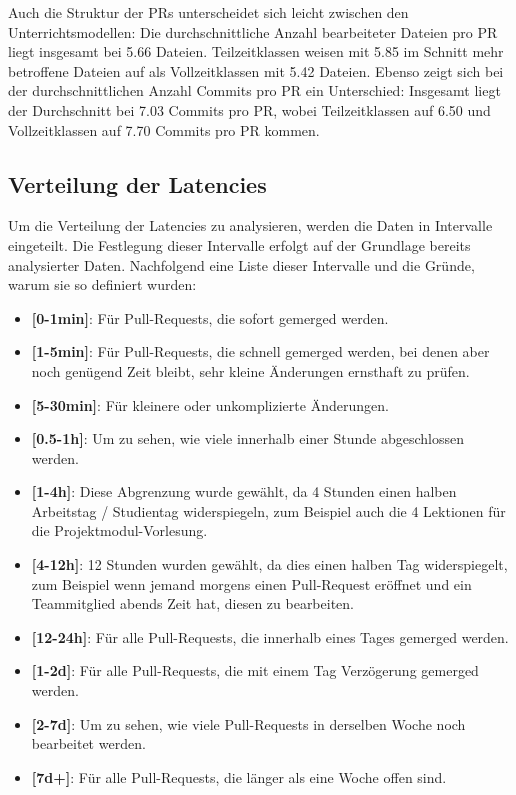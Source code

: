 Auch die Struktur der PRs unterscheidet sich leicht zwischen den Unterrichtsmodellen: Die durchschnittliche Anzahl bearbeiteter Dateien pro PR liegt insgesamt bei 5.66 Dateien. Teilzeitklassen weisen mit 5.85 im Schnitt mehr betroffene Dateien auf als Vollzeitklassen mit 5.42 Dateien. Ebenso zeigt sich bei der durchschnittlichen Anzahl Commits pro PR ein Unterschied: Insgesamt liegt der Durchschnitt bei 7.03 Commits pro PR, wobei Teilzeitklassen auf 6.50 und Vollzeitklassen auf 7.70 Commits pro PR kommen.

\subsection{Verteilung der Latencies}
Um die Verteilung der Latencies zu analysieren, werden die Daten in Intervalle eingeteilt. Die Festlegung dieser Intervalle erfolgt auf der Grundlage bereits analysierter Daten. Nachfolgend eine Liste dieser Intervalle und die Gründe, warum sie so definiert wurden: 

\begin{itemize}
    \item \textbf{[0-1min]}: Für Pull-Requests, die sofort gemerged werden.
    \item \textbf{[1-5min]}: Für Pull-Requests, die schnell gemerged werden, bei denen aber noch genügend Zeit bleibt, sehr kleine Änderungen ernsthaft zu prüfen.
    \item \textbf{[5-30min]}: Für kleinere oder unkomplizierte Änderungen.
    \item \textbf{[0.5-1h]}: Um zu sehen, wie viele innerhalb einer Stunde abgeschlossen werden.
    \item \textbf{[1-4h]}: Diese Abgrenzung wurde gewählt, da 4 Stunden einen halben Arbeitstag / Studientag widerspiegeln, zum Beispiel auch die 4 Lektionen für die Projektmodul-Vorlesung.
    \item \textbf{[4-12h]}: 12 Stunden wurden gewählt, da dies einen halben Tag widerspiegelt, zum Beispiel wenn jemand morgens einen Pull-Request eröffnet und ein Teammitglied abends Zeit hat, diesen zu bearbeiten.
    \item \textbf{[12-24h]}: Für alle Pull-Requests, die innerhalb eines Tages gemerged werden.
    \item \textbf{[1-2d]}: Für alle Pull-Requests, die mit einem Tag Verzögerung gemerged werden.
    \item \textbf{[2-7d]}: Um zu sehen, wie viele Pull-Requests in derselben Woche noch bearbeitet werden.
    \item \textbf{[7d+]}: Für alle Pull-Requests, die länger als eine Woche offen sind.
\end{itemize}


